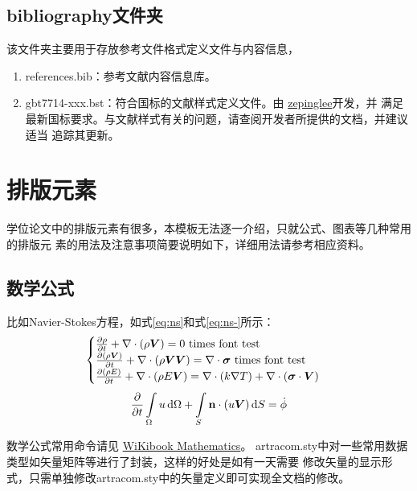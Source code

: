 \subsection{bibliography文件夹}

该文件夹主要用于存放参考文件格式定义文件与内容信息，

\begin{enumerate}
    \item references.bib：参考文献内容信息库。
    \item gbt7714-xxx.bst：符合国标的文献样式定义文件。由
    \href{https://github.com/zepinglee/gbt7714-bibtex-style}{zepinglee}开发，并
    满足最新国标要求。与文献样式有关的问题，请查阅开发者所提供的文档，并建议适当
    追踪其更新。
\end{enumerate}

\section{排版元素}

学位论文中的排版元素有很多，本模板无法逐一介绍，只就公式、图表等几种常用的排版元
素的用法及注意事项简要说明如下，详细用法请参考相应资料。

\subsection{数学公式}

比如Navier-Stokes方程，如式\eqref{eq:ns}和式\eqref{eq:ns-}所示：
\begin{equation}
    \label{eq:ns}
    \begin{cases}
        \frac{\partial \rho}{\partial t} + \nabla\cdot(\rho\Vector{V}) = 0 \ \mathrm{times\ font\ test}\\
        \frac{\partial (\rho\Vector{V})}{\partial t} + \nabla\cdot(\rho\Vector{V}\Vector{V}) = \nabla\cdot\Tensor{\sigma} \ \text{times font test}\\
        \frac{\partial (\rho E)}{\partial t} + \nabla\cdot(\rho E\Vector{V}) = \nabla\cdot(k\nabla T) + \nabla\cdot(\Tensor{\sigma}\cdot\Vector{V})
    \end{cases}
\end{equation}
\begin{equation}
    \label{eq:ns-}
    \frac{\partial }{\partial t}\int\limits_{\Omega} u \, \mathrm{d}\Omega + \int\limits_{S} \boldsymbol{\mathbf{n}}\cdot(u\boldsymbol{V}) \, \mathrm{d}S = \dot{\phi}
\end{equation}

数学公式常用命令请见
\href{https://en.wikibooks.org/wiki/LaTeX/Mathematics}{WiKibook Mathematics}。
artracom.sty中对一些常用数据类型如矢量矩阵等进行了封装，这样的好处是如有一天需要
修改矢量的显示形式，只需单独修改artracom.sty中的矢量定义即可实现全文档的修改。

